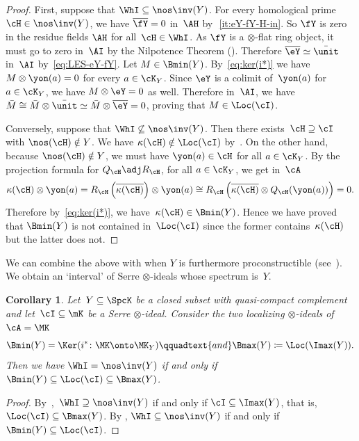 \documentclass[11pt]{amsart}
\numberwithin{equation}{section} %
\theoremstyle{plain}
\newtheorem{cor}[equation]{Corollary}
\theoremstyle{definition}
\theoremstyle{remark}
\begin{document}
\begin{proof}
First, suppose that $\WhI\subseteq \nos\inv(Y)$. For every homological prime~$\cH \in \nos \inv(Y)$, we have $\overline{\fY} =0$ in~$\AH$ by~\,\eqref{it:eY-fY-H-in}. So $\fY$ is zero in the residue fields $\AH$ for all~$\cH\in\WhI$.
As $\fY$ is a $\otimes$-flat ring object, it must go to zero in~$\AI$ by the Nilpotence Theorem ().
Therefore $\overline{\eY}\simeq \bar\unit$ in~$\AI$ by~\eqref{eq:LES-eY-fY}. Let $M\in \Bmin(Y)$. By~\eqref{eq:ker(i*)} we have $M \otimes \yon(a) = 0$ for every $a\in \cK_Y$. Since $\eY$ is a colimit of~$\yon(a)$ for $ a \in \cK_Y$, we have $M\otimes \eY=0$ as well. Therefore in~$\AI$, we have $\bar M\cong \bar M\otimes \bar \unit \simeq \bar M\otimes \overline{\eY}= 0$, proving that $M\in \Loc(\cI)$. 

Conversely, suppose that $\WhI\not\subseteq \nos\inv(Y)$. Then there exists~$\cH\supseteq\cI$ with $\nos(\cH)\notin Y$. We have $\kappa(\cH)\notin\Loc(\cI)$ by~. On the other hand, because $\nos(\cH) \notin Y$, we must have $\yon(a) \in \cH$ for all $a \in \cK_Y$.
By the projection formula for $Q_{\cH} \adj R_{\cH}$, for all $a \in \cK_Y$, we get in~$\cA$
\begin{equation*}
    \kappa(\cH)\otimes\yon(a) = R_{\cH}\left(\overline{\kappa(\cH)}\right) \otimes \yon(a) \cong R_{\cH} \left( \overline{\kappa(\cH)} \otimes  Q_{\cH}(\yon(a) ) \right) =0.
\end{equation*}
Therefore by~\eqref{eq:ker(i*)}, we have~$\kappa(\cH) \in \Bmin(Y)$. Hence we have proved that $\Bmin(Y)$ is not contained in~$\Loc(\cI)$ since the former contains~$\kappa(\cH)$ but the latter does not.
\end{proof}

We can combine the above with  when $Y$ is furthermore proconstructible (see~). We obtain an `interval' of Serre $\otimes$-ideals whose spectrum is~$Y$.
%
\begin{cor}
\label{cor:bookend}%
Let~$Y\subseteq\SpcK$ be a closed subset with quasi-compact complement and let~$\cI\subseteq \mK$ be a Serre $\otimes$-ideal. Consider the two localizing $\otimes$-ideals of~$\cA=\MK$
%
\[
\Bmin(Y)=\Ker(i^*\colon \MK\onto \MK_Y)
\qquadtext{and}
\Bmax(Y)\coloneq\Loc(\Imax(Y)).
\]
%
Then we have $\WhI=\nos\inv(Y)$ if and only if~$\Bmin(Y)\subseteq \Loc(\cI)\subseteq\Bmax(Y)$.
\end{cor}

\begin{proof}
By~,~$\WhI\supseteq\nos\inv(Y)$ if and only if
$\cI\subseteq \Imax(Y)$, that is, $\Loc(\cI)\subseteq \Bmax(Y)$.
By , $\WhI\subseteq\nos\inv(Y)$ if and only if~$\Bmin(Y)\subseteq\Loc(\cI)$.
\end{proof}
\end{document}
